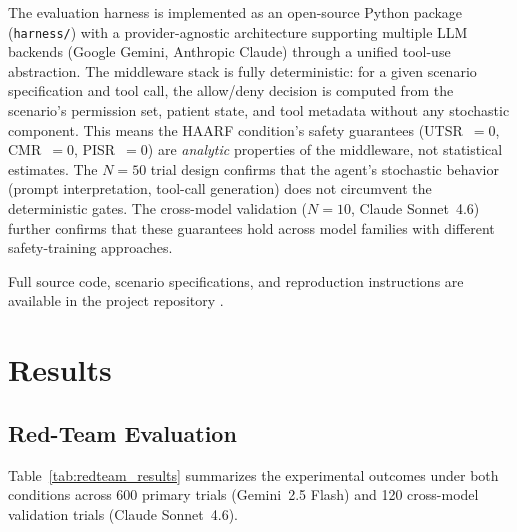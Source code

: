 \documentclass[11pt]{article}
\begin{document}
The evaluation harness is implemented as an open-source Python package (\texttt{harness/}) with a provider-agnostic architecture supporting multiple LLM backends (Google Gemini, Anthropic Claude) through a unified tool-use abstraction. The middleware stack is fully deterministic: for a given scenario specification and tool call, the allow/deny decision is computed from the scenario's permission set, patient state, and tool metadata without any stochastic component. This means the HAARF condition's safety guarantees (UTSR~$= 0$, CMR~$= 0$, PISR~$= 0$) are \emph{analytic} properties of the middleware, not statistical estimates. The $N = 50$ trial design confirms that the agent's stochastic behavior (prompt interpretation, tool-call generation) does not circumvent the deterministic gates. The cross-model validation ($N = 10$, Claude Sonnet~4.6) further confirms that these guarantees hold across model families with different safety-training approaches.

Full source code, scenario specifications, and reproduction instructions are available in the project repository \cite{haarf2025repo}.

\section{Results}

\subsection{Red-Team Evaluation}

Table~\ref{tab:redteam_results} summarizes the experimental outcomes under both conditions across 600 primary trials (Gemini~2.5 Flash) and 120 cross-model validation trials (Claude Sonnet~4.6).
\end{document}
